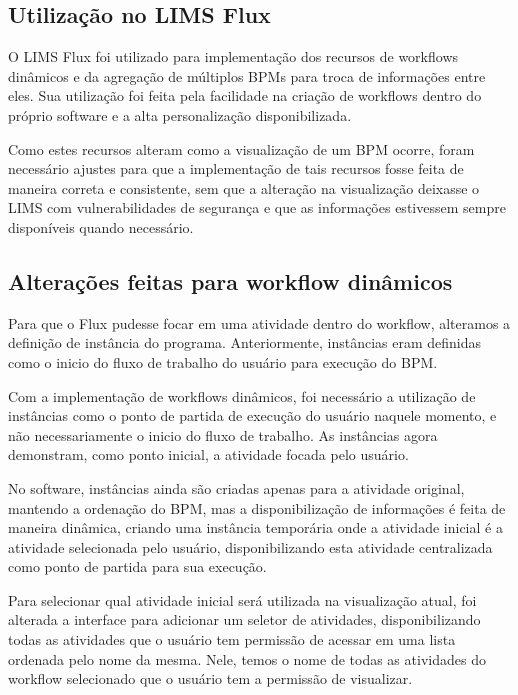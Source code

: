 \subsection{Utilização no LIMS Flux}

O LIMS Flux foi utilizado para implementação dos recursos de workflows dinâmicos e da agregação de múltiplos BPMs para troca de informações entre eles. Sua utilização foi feita pela facilidade na criação de workflows dentro do próprio software e a alta personalização disponibilizada.

Como estes recursos alteram como a visualização de um BPM ocorre, foram necessário ajustes para que a implementação de tais recursos fosse feita de maneira correta e consistente, sem que a alteração na visualização deixasse o LIMS com vulnerabilidades de segurança e que as informações estivessem sempre disponíveis quando necessário.

\subsection{Alterações feitas para workflow dinâmicos}

Para que o Flux pudesse focar em uma atividade dentro do workflow, alteramos a definição de instância do programa. Anteriormente, instâncias eram definidas como o inicio do fluxo de trabalho do usuário para execução do BPM.

Com a implementação de workflows dinâmicos, foi necessário a utilização de instâncias como o ponto de partida de execução do usuário naquele momento, e não necessariamente o inicio do fluxo de trabalho. As instâncias agora demonstram, como ponto inicial, a atividade focada pelo usuário.

No software, instâncias ainda são criadas apenas para a atividade original, mantendo a ordenação do BPM, mas a disponibilização de informações é feita de maneira dinâmica, criando uma instância temporária onde a atividade inicial é a atividade selecionada pelo usuário, disponibilizando esta atividade centralizada como ponto de partida para sua execução.

Para selecionar qual atividade inicial será utilizada na visualização atual, foi alterada a interface para adicionar um seletor de atividades, disponibilizando todas as atividades que o usuário tem permissão de acessar em uma lista ordenada pelo nome da mesma. Nele, temos o nome de todas as atividades do workflow selecionado que o usuário tem a permissão de visualizar.

